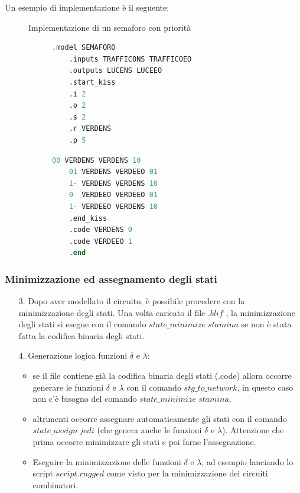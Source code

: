 \documentclass[a4paper]{article}
\theoremstyle{break}
\theoremstyle{break}
\theoremstyle{break}
\theoremstyle{break}
\begin{document}
Un esempio di implementazione è il seguente:

\begin{figure}[H]
  \begin{example}
    Implementazione di un semaforo con priorità
    \begin{figure}[H]
  \begin{lstlisting}[language=Verilog]
    .model SEMAFORO
    .inputs TRAFFICONS TRAFFICOEO
    .outputs LUCENS LUCEEO
    .start_kiss
    .i 2
    .o 2
    .s 2
    .r VERDENS
    .p 5
    \end{lstlisting}
  \end{figure}

  \begin{figure}[H]
  \begin{lstlisting}[language=Verilog]
    00 VERDENS VERDENS 10
    01 VERDENS VERDEEO 01
    1- VERDENS VERDENS 10
    0- VERDEEO VERDEEO 01
    1- VERDEEO VERDENS 10
    .end_kiss
    .code VERDENS 0
    .code VERDEEO 1
    .end
  \end{lstlisting}
\end{figure}
  \end{example}
\end{figure}

\subsubsection{Minimizzazione ed assegnamento degli stati}
\begin{enumerate}
  \item[3.] Dopo aver modellato il circuito, è possibile procedere con la
  minimizzazione degli stati. Una volta caricato il file \( .blif \) , la
  minimizzazione degli stati si esegue con il comando \( state\_minimize\;stamina \) se
  non è stata fatta la codifica binaria degli stati.
\item [4.] Generazione logica funzioni \( \delta \) e \( \lambda \):
  \begin{itemize}
    \item se il file contiene già la codifica binaria degli stati (.code) allora
    occorre generare le funzioni \( \delta \) e \( \lambda \)  con il comando \( stg\_to\_network \),
    in questo caso non c'è bisogno del comando \( state\_minimize\;stamina \).
    \item altrimenti occorre assegnare automaticamente gli stati con il comando
    \( state\_assign\;jedi \) (che genera anche le funzioni \( \delta \)  e \( \lambda \)).
    Attenzione che prima occorre minimizzare gli stati e poi farne l’assegnazione.
    \item Eseguire la minimizzazione delle funzioni \( \delta \) e \( \lambda \), ad esempio lanciando
    lo script \(script.rugged\) come visto per la minimizzazione dei circuiti
    combinatori.
  \end{itemize}

\end{enumerate}
\end{document}
